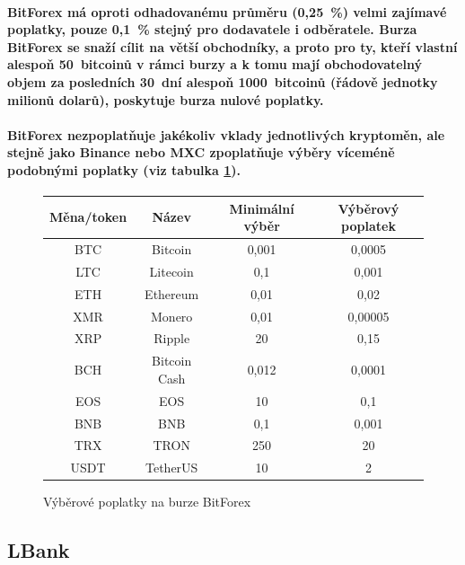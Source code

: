 \documentclass[thesis=B,czech]{FITthesis}[2019/03/21]
\begin{document}
\paragraph{
BitForex má oproti odhadovanému průměru (0,25~\%) velmi zajímavé poplatky, pouze 0,1~\% stejný pro dodavatele i odběratele. Burza BitForex se snaží cílit na větší obchodníky, a proto pro ty, kteří vlastní alespoň 50~bitcoinů v rámci burzy a k tomu mají obchodovatelný objem za posledních 30~dní alespoň 1000~bitcoinů (řádově jednotky milionů dolarů), poskytuje burza nulové poplatky. 
}
\paragraph{
BitForex nezpoplatňuje jakékoliv vklady jednotlivých kryptoměn, ale stejně jako Binance nebo MXC zpoplatňuje výběry víceméně podobnými poplatky (viz tabulka \ref{bitforex_fees}). \cite{cryptowisser_bitforex}
}

\begin{figure}\centering
    \begin{center}
     \begin{tabular}{||c | c | c | c||} 
     \hline
     Měna/token & Název & Minimální výběr & Výběrový poplatek \\ [0.5ex] 
     \hline\hline
     BTC & Bitcoin & 0,001 & 0,0005 \\ 
     \hline
     LTC & Litecoin & 0,1 & 0,001 \\
     \hline
     ETH & Ethereum & 0,01 & 0,02 \\
     \hline
     XMR & Monero & 0,01 & 0,00005 \\
     \hline
     XRP & Ripple & 20 & 0,15 \\
     \hline
     BCH & Bitcoin Cash & 0,012 & 0,0001 \\
     \hline
     EOS & EOS & 10 & 0,1 \\
     \hline
     BNB & BNB & 0,1 & 0,001 \\
     \hline
     TRX & TRON & 250 & 20 \\
     \hline
     USDT & TetherUS & 10 & 2 \\ [1ex] 
     \hline
    \end{tabular}
    \end{center}
    \caption{Výběrové poplatky na burze BitForex \cite{bitforex_fees}}
    \label{bitforex_fees}
\end{figure}

\subsection{LBank}
\end{document}
